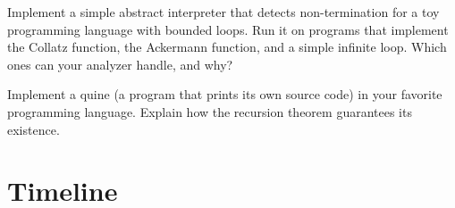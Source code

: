 \begin{exercise}[Computational]
Implement a simple abstract interpreter that detects non-termination for a toy programming language with bounded loops. Run it on programs that implement the Collatz function, the Ackermann function, and a simple infinite loop. Which ones can your analyzer handle, and why?
\end{exercise}

\begin{exercise}[Computational]
Implement a quine (a program that prints its own source code) in your favorite programming language. Explain how the recursion theorem guarantees its existence.
\end{exercise}

\section{Timeline}
\label{sec:halting:timeline}

